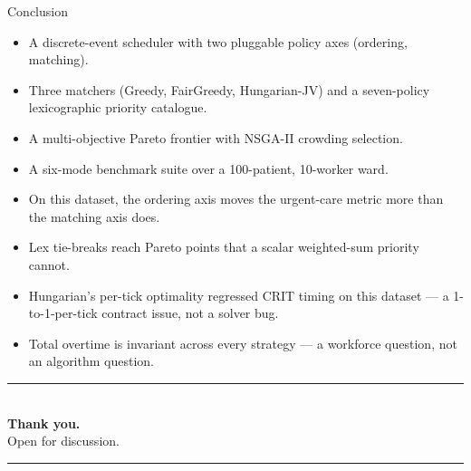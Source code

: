 \documentclass[aspectratio=169, 11pt]{beamer}
\begin{document}
\begin{frame}{Conclusion}
  \begin{itemize}\small
    \item A discrete-event scheduler with two pluggable policy axes
          (ordering, matching).
    \item Three matchers (Greedy, FairGreedy, Hungarian-JV) and a
          seven-policy lexicographic priority catalogue.
    \item A multi-objective Pareto frontier with NSGA-II crowding
          selection.
    \item A six-mode benchmark suite over a 100-patient, 10-worker ward.
  \end{itemize}
  \vspace{0.3em}
  \begin{itemize}\small
    \item On this dataset, the ordering axis moves the urgent-care
          metric more than the matching axis does.
    \item Lex tie-breaks reach Pareto points that a scalar
          weighted-sum priority cannot.
    \item Hungarian's per-tick optimality regressed CRIT timing on
          this dataset --- a 1-to-1-per-tick contract issue, not a
          solver bug.
    \item Total overtime is invariant across every strategy --- a
          workforce question, not an algorithm question.
  \end{itemize}
\end{frame}

\begin{frame}[plain]
  \vfill
  \begin{center}
    \textcolor{ruleblue}{\rule{0.42\paperwidth}{0.6pt}}\\[1.0em]
    {\sffamily\Huge\bfseries\color{ruleblue} Thank you.}\\[0.8em]
    {\sffamily\LARGE\color{slate} Open for discussion.}\\[1.0em]
    \textcolor{ruleblue}{\rule{0.42\paperwidth}{0.6pt}}
  \end{center}
  \vfill
\end{frame}
\end{document}
